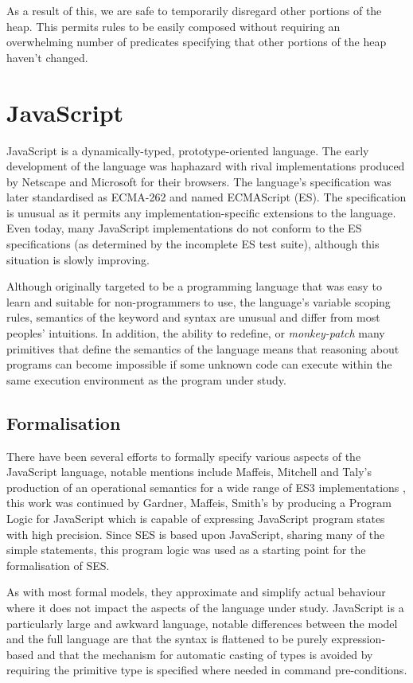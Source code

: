 \documentclass[a4paper,notitlepage]{report}
\begin{document}
  As a result of this, we are safe to temporarily disregard other portions of
  the heap. This permits rules to be easily composed without requiring an
  overwhelming number of predicates specifying that other portions of the heap
  haven't changed.

\section{JavaScript}

  JavaScript is a dynamically-typed, prototype-oriented language. The
  early development of the language was haphazard with rival implementations
  produced by Netscape and Microsoft for their browsers. The language's
  specification was later standardised as ECMA-262 and named ECMAScript (ES).
  The specification is unusual as it permits any
  implementation-specific extensions to the language. Even today, many
  JavaScript implementations do not conform to the ES specifications (as
  determined by the incomplete ES test suite), although this situation is slowly
  improving.

  Although originally targeted to be a programming language that was easy to
  learn and suitable for non-programmers to use, the language's variable scoping
  rules, semantics of the  keyword and  syntax are unusual
  and differ from most peoples' intuitions. In addition, the ability to
  redefine, or \emph{monkey-patch} many primitives that define the semantics of
  the language means that reasoning about programs can become impossible if
  some unknown code can execute within the same execution environment as the
  program under study.

  \subsection{Formalisation}
  There have been several efforts to formally specify various aspects of the
  JavaScript language, notable mentions include Maffeis, Mitchell and Taly's
  production of an operational semantics for a wide range of ES3
  implementations \cite{maffeis-jsopsem}, this work was continued by
  Gardner, Maffeis, Smith's \cite{gms-popl} by producing a
  Program Logic for JavaScript which is capable of expressing JavaScript
  program states with high precision. Since SES is based upon JavaScript,
  sharing many of the simple statements, this program logic was used as a
  starting point for the formalisation of SES.

  As with most formal models, they approximate and simplify actual behaviour
  where it does not impact the aspects of the language under study. JavaScript
  is a particularly large and awkward language, notable differences between the
  model and the full language are that the syntax is flattened to be purely
  expression-based and that the mechanism for automatic casting of types is
  avoided by requiring the primitive type is specified where needed in command
  pre-conditions.
\end{document}
